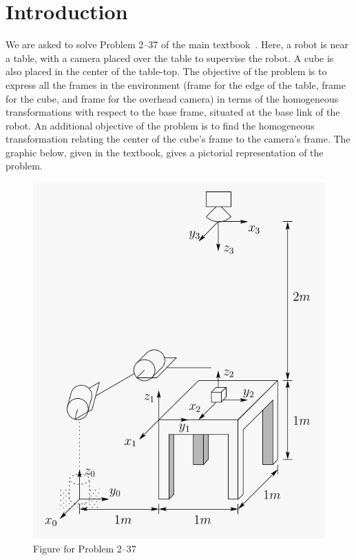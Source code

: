 \documentclass[conference]{IEEEtran}
\begin{document}
\section{Introduction}
We are asked to solve Problem 2--37 of the main textbook~\cite{Spong2006}. Here,
a robot is near a table, with a camera placed over the table to supervise the
robot. A cube is also placed in the center of the table-top. 
The objective of the problem is to express all the frames in the environment
(frame for the edge of the table, frame for the cube,
and frame for the overhead camera) in terms of the homogeneous transformations with
respect to the base frame, situated at the base link of the robot. An additional
objective of the problem is to find the homogeneous transformation relating
the center of the cube's frame to the camera's frame. The graphic below, given
in the textbook, gives a pictorial representation of the problem.
\begin{figure}[h]
    \centering
    \includegraphics[scale=0.4]{./prob3-37-fig.png}
    \caption{Figure for Problem 2--37}
\end{figure}
\end{document}

